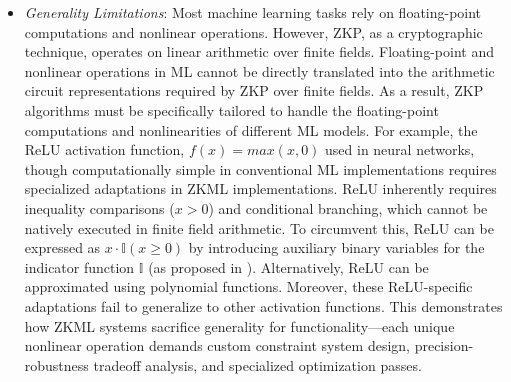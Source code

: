 \documentclass[journal]{IEEEtran}
\begin{document}
\begin{itemize}
    \item \emph{Generality Limitations}: Most machine learning tasks rely on floating-point computations and nonlinear operations. However, ZKP, as a cryptographic technique, operates on linear arithmetic over finite fields. Floating-point and nonlinear operations in ML cannot be directly translated into the arithmetic circuit representations required by ZKP over finite fields. As a result, ZKP algorithms must be specifically tailored to handle the floating-point computations and nonlinearities of different ML models. For example, the ReLU activation function, $f(x)=max(x,0)$ used in neural networks, though computationally simple in conventional ML implementations requires specialized adaptations in ZKML implementations. ReLU inherently requires inequality comparisons ($x>0$) and conditional branching, which cannot be natively executed in finite field arithmetic. To circumvent this, ReLU can be expressed as $x\cdot \mathbb{I}(x{\geq}0)$ by introducing auxiliary binary variables for the indicator function $\mathbb{I}$ (as proposed in \cite{sun2023zkdl}). Alternatively, ReLU can be approximated using polynomial functions. Moreover, these ReLU-specific adaptations fail to generalize to other activation functions. This demonstrates how ZKML systems sacrifice generality for functionality---each unique nonlinear operation demands custom constraint system design, precision-robustness tradeoff analysis, and specialized optimization passes. 
    
    
    

\end{itemize}
\end{document}
